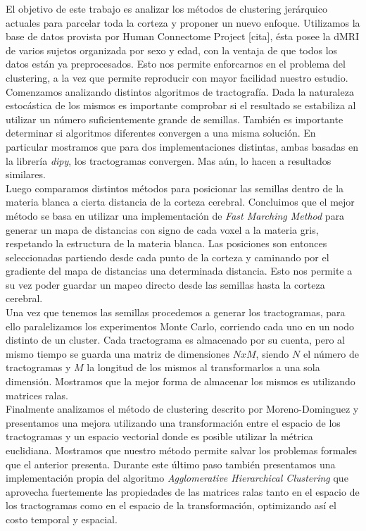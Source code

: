 El objetivo de este trabajo es analizar los m\'etodos de clustering jer\'arquico
actuales para parcelar toda la corteza y proponer un nuevo enfoque. Utilizamos
la base de datos provista por Human Connectome Project [cita], \'esta posee la
dMRI de varios sujetos organizada por sexo y edad, con la ventaja de que todos
los datos est\'an ya preprocesados. Esto nos permite enforcarnos en el problema
del clustering, a la vez que permite reproducir con mayor facilidad nuestro 
estudio. \\

Comenzamos analizando distintos algoritmos de tractograf\'ia. Dada la naturaleza
estoc\'astica de los mismos es importante comprobar si el resultado se estabiliza
al utilizar un n\'umero suficientemente grande de semillas. Tambi\'en es
importante determinar si algoritmos diferentes convergen a una misma soluci\'on.
En particular mostramos que para dos implementaciones distintas, ambas basadas 
en la librer\'ia \textit{dipy}, los tractogramas convergen. Mas a\'un, lo hacen
a resultados similares. \\

Luego comparamos distintos m\'etodos para posicionar las semillas dentro de la
materia blanca a cierta distancia de la corteza cerebral. Concluimos que el mejor
m\'etodo se basa en  utilizar una implementaci\'on de \textit{Fast Marching Method}
para generar un mapa de distancias con signo de cada voxel a la materia gris,
respetando la estructura de la materia blanca. Las posiciones son entonces 
seleccionadas partiendo desde cada punto de la corteza y caminando por el 
gradiente del mapa de distancias una determinada distancia. Esto nos permite a
su vez poder guardar un mapeo directo desde las semillas hasta la corteza cerebral. \\

Una vez que tenemos las semillas procedemos a generar los tractogramas, para ello
paralelizamos los experimentos Monte Carlo, corriendo cada uno en un nodo distinto
de un cluster. Cada tractograma es almacenado por su cuenta, pero al mismo tiempo
se guarda una matriz de dimensiones $NxM$, siendo $N$ el n\'umero de tractogramas
y $M$ la longitud de los mismos al transformarlos a una sola dimensi\'on.
Mostramos que la mejor forma de almacenar los mismos es utilizando matrices ralas. \\

Finalmente analizamos el m\'etodo de clustering descrito por Moreno-Dominguez y
presentamos una mejora utilizando una transformaci\'on entre el espacio de los
tractogramas y un espacio vectorial donde es posible utilizar la m\'etrica euclidiana. 
Mostramos que nuestro m\'etodo permite salvar los problemas formales que el
anterior presenta. Durante este \'ultimo paso tambi\'en presentamos una 
implementaci\'on propia del algoritmo \textit{Agglomerative Hierarchical
Clustering} que aprovecha fuertemente las propiedades de las matrices ralas tanto
en el espacio de los tractogramas como en el espacio de la transformaci\'on, 
optimizando as\'i el costo temporal y espacial.
